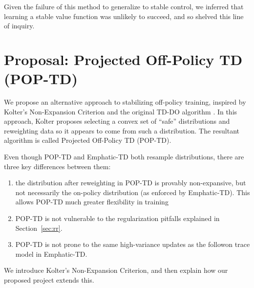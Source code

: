 \documentclass[11pt]{article}
\begin{document}
Given the failure of this method to generalize to stable control, we inferred that learning a stable value function was unlikely to succeed, and so shelved this line of inquiry.

\section{Proposal: Projected Off-Policy TD (POP-TD) }

We propose an alternative approach to stabilizing off-policy training, inspired by Kolter's Non-Expansion Criterion and the original TD-DO algorithm \cite{kolter2011fixed}. 
In this approach, Kolter proposes selecting a convex set of ``safe'' distributions and reweighting data so it appears to come from such a distribution. The resultant algorithm is called Projected Off-Policy TD (POP-TD).

Even though POP-TD and Emphatic-TD both resample distributions, there are three key differences between them:
\begin{enumerate}
  \item the distribution after reweighting in POP-TD is provably non-expansive, but not necessarily the on-policy distribution (as enforced by Emphatic-TD). This allows POP-TD much greater flexibility in training
  \item POP-TD is not vulnerable to the regularization pitfalls explained in Section~\ref{sec:rr}.
  \item POP-TD is not prone to the same high-variance updates as the followon trace model in Emphatic-TD.
\end{enumerate}
We introduce Kolter's Non-Expansion Criterion, and then explain how our proposed project extends this.

\end{document}
